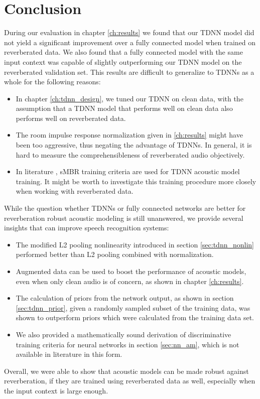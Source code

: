 
\chapter{Conclusion}
\label{ch:Conclusion}
During our evaluation in chapter \ref{ch:results} we found that our TDNN model did not yield a significant improvement over a fully connected model when trained on reverberated data. We also found that a fully connected model with the same input context was capable of slightly outperforming our TDNN model on the reverberated validation set. This results are difficult to generalize to TDNNs as a whole for the following reasons: 
\begin{itemize}
	\item In chapter \ref{ch:tdnn_design}, we tuned our TDNN on clean data, with the assumption that a TDNN model that performs well on clean data also performs well on reverberated data. 
	\item The room impulse response normalization given in \ref{ch:results} might have been too aggressive, thus negating the advantage of TDNNs. In general, it is hard to measure the comprehensibleness of reverberated audio objectively.  
	\item In literature \cite{peddinti2015jhu} \cite{peddinti2015reverberation}, sMBR training criteria are used for TDNN acoustic model training. It might be worth to investigate this training procedure more closely when working with reverberated data.  
\end{itemize}
While the question whether TDNNs or fully connected networks are better for reverberation robust acoustic modeling is still unanswered, we provide several insights that can improve speech recognition systems:
\begin{itemize}
	\item The modified L2 pooling nonlinearity introduced in section \ref{sec:tdnn_nonlin} performed better than L2 pooling combined with normalization.
	\item Augmented data can be used to boost the performance of acoustic models, even when only clean audio is of concern, as shown in chapter \ref{ch:results}.
	\item The calculation of priors from the network output, as shown in section \ref{sec:tdnn_prior}, given a randomly sampled subset of the training data, was shown to outperform priors which were calculated from the training data set. 
	\item We also provided a mathematically sound derivation of discriminative training criteria for neural networks in section \ref{sec:nn_am}, which is not available in literature in this form.
\end{itemize}
Overall, we were able to show that acoustic models can be made robust against reverberation, if they are trained using reverberated data as well, especially when the input context is large enough. 